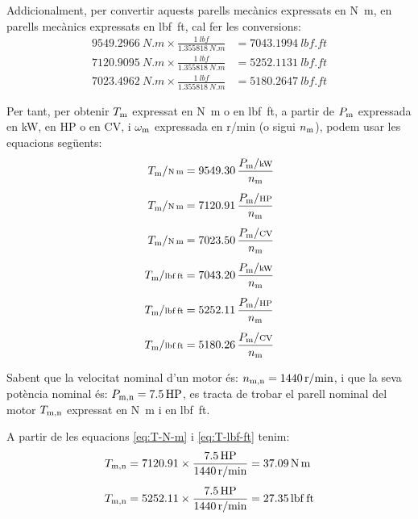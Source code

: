 Addicionalment, per  convertir aquests parells mecànics expressats en \si{N.m}, en parells mecànics expressats en \si{lbf.ft}, cal  fer les conversions:
\begin{subequations}
\begin{align}
    \SI{9549,2966}{N.m} \times \frac{\SI{1}{lbf}}{\SI{1,355818}{N.m}} &= \SI{7043,1994}{lbf.ft} \\[1ex]
    \SI{7120,9095}{N.m} \times \frac{\SI{1}{lbf}}{\SI{1,355818}{N.m}} &= \SI{5252,1131}{lbf.ft} \\[1ex]
    \SI{7023,4962}{N.m} \times \frac{\SI{1}{lbf}}{\SI{1,355818}{N.m}} &= \SI{5180,2647}{lbf.ft}
\end{align}
\end{subequations}

Per tant, per  obtenir $T\ped{m}$ expressat en \si{N.m} o en \si{lbf.ft}, a partir de $P\ped{m}$ expressada en kW, en HP o en CV, i $\omega\ped{m}$ expressada en \si{r/min} (o sigui $n\ped{m}$),  podem usar les equacions següents:
\begin{subequations}
\begin{align}
    T\ped{m}/{\scriptstyle \si{N.m}} &= \num{9549,30}\,  \frac{P\ped{m}/{\scriptstyle \si{kW}}}{n\ped{m}} \\[1ex]
    T\ped{m}/{\scriptstyle \si{N.m}} &= \num{7120,91}\,  \frac{P\ped{m}/{\scriptstyle \si{HP}}}{n\ped{m}}\label{eq:T-N-m} \\[1ex]
    T\ped{m}/{\scriptstyle \si{N.m}} &= \num{7023,50}\,  \frac{P\ped{m}/{\scriptstyle \si{CV}}}{n\ped{m}} \\[1ex]
    T\ped{m}/{\scriptstyle \si{lbf.ft}} &= \num{7043,20}\,  \frac{P\ped{m}/{\scriptstyle \si{kW}}}{n\ped{m}} \\[1ex]
    T\ped{m}/{\scriptstyle \si{lbf.ft}} &= \num{5252,11}\,  \frac{P\ped{m}/{\scriptstyle \si{HP}}}{n\ped{m}}\label{eq:T-lbf-ft} \\[1ex]
    T\ped{m}/{\scriptstyle \si{lbf.ft}} &= \num{5180,26}\,  \frac{P\ped{m}/{\scriptstyle \si{CV}}}{n\ped{m}}
\end{align}
\end{subequations}


\begin{exemple}
    Sabent que la velocitat nominal d'un motor és: $n\ped{m,n} = \SI{1440}{r/min}$, i que la seva potència nominal és: $P\ped{m,n} = \SI{7,5}{HP}$,   es tracta de trobar el parell nominal del motor $T\ped{m,n}$ expressat en \si{N.m} i en \si{lbf.ft}.

    A partir de les equacions  \eqref{eq:T-N-m} i \eqref{eq:T-lbf-ft} tenim:
    \begin{align*}
      T\ped{m,n} &= \num{7120,91} \times \frac{\SI{7,5}{HP}}{\SI{1440}{r/min}} = \SI{37,09}{N.m} \\[1ex]
      T\ped{m,n} &= \num{5252,11} \times \frac{\SI{7,5}{HP}}{\SI{1440}{r/min}} = \SI{27,35}{lbf.ft}
    \end{align*}
\end{exemple}


